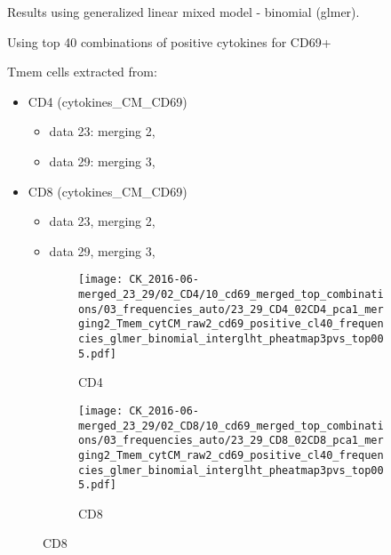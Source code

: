 \documentclass[a4paper, 12pt]{article}
\begin{document}
\pagestyle{empty}


Results using generalized linear mixed model - binomial (glmer).

Using top 40 combinations of positive cytokines for CD69+

Tmem cells extracted from:
\begin{itemize}
  \item  CD4 (cytokines\_CM\_CD69)
      \begin{itemize}
      \item data 23: merging 2, 
      \item data 29: merging 3,
    \end{itemize}

  \item  CD8 (cytokines\_CM\_CD69)
  \begin{itemize}
  \item data 23, merging 2,
  \item data 29, merging 3, 
\end{itemize}
  
\end{itemize}


\begin{figure}[!thb]
\centering

    \begin{subfigure}[t]{0.02\textwidth}
    \vskip 0pt
        \textbf{\textsf{\normalsize }}
    \end{subfigure}
    \begin{subfigure}[t]{0.45\textwidth}
    \vskip 0pt
    \caption{CD4}
        \texttt{[image: CK\_2016-06-merged\_23\_29/02\_CD4/10\_cd69\_merged\_top\_combinations/03\_frequencies\_auto/23\_29\_CD4\_02CD4\_pca1\_merging2\_Tmem\_cytCM\_raw2\_cd69\_positive\_cl40\_frequencies\_glmer\_binomial\_interglht\_pheatmap3pvs\_top005.pdf]}
    \end{subfigure}
\quad
    \begin{subfigure}[t]{0.02\textwidth}
    \vskip 0pt
        \textbf{\textsf{\normalsize }}
    \end{subfigure}
    \begin{subfigure}[t]{0.45\textwidth}
    \vskip 0pt
    \caption{CD8}
        \texttt{[image: CK\_2016-06-merged\_23\_29/02\_CD8/10\_cd69\_merged\_top\_combinations/03\_frequencies\_auto/23\_29\_CD8\_02CD8\_pca1\_merging2\_Tmem\_cytCM\_raw2\_cd69\_positive\_cl40\_frequencies\_glmer\_binomial\_interglht\_pheatmap3pvs\_top005.pdf]}
    \end{subfigure}
    
    
\end{figure}
\end{document}
